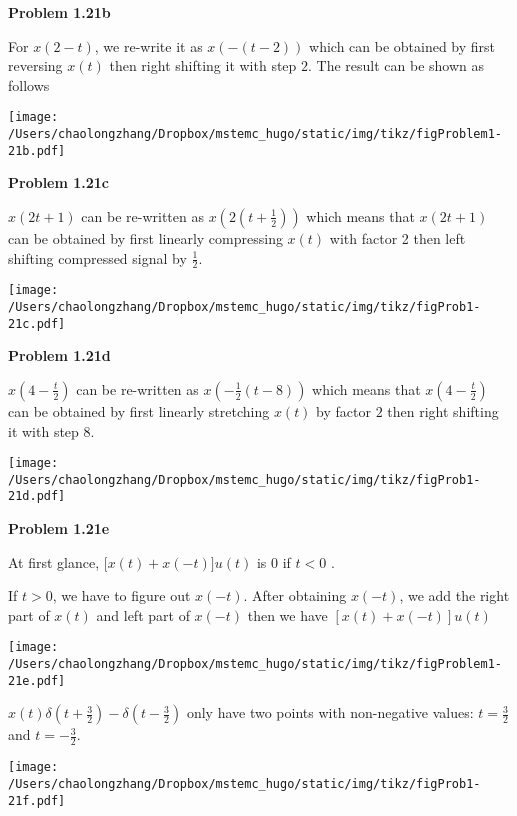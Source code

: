 \documentclass[koma,a4paper,utopia,12pt,listings-color,microtype,paralist,colorlinks,urlcolor=red]{org-article}
\begin{document}
\textbf{Problem 1.21b}

For \(x(2-t)\), we re-write it as \(x(-(t-2))\) which can be obtained by first
reversing \(x(t)\) then right shifting it with step \(2\). The result can be
shown as follows

\begin{center}
\texttt{[image: /Users/chaolongzhang/Dropbox/mstemc\_hugo/static/img/tikz/figProblem1-21b.pdf]}
\end{center}

\textbf{Problem 1.21c}

\(x(2t + 1)\) can be re-written as \(x(2(t+\frac{1}{2}))\) which means that
\(x(2t+1)\) can be obtained by first linearly compressing \(x(t)\) with factor 2
then left shifting compressed signal by \(\frac{1}{2}\).

\begin{center}
\texttt{[image: /Users/chaolongzhang/Dropbox/mstemc\_hugo/static/img/tikz/figProb1-21c.pdf]}
\end{center}

\textbf{Problem 1.21d}

\(x(4-\frac{t}{2})\) can be re-written as \(x( -\frac{1}{2}( t - 8 ) )\) which
means that \(x(4-\frac{t}{2})\)  can be obtained by first linearly stretching
\(x(t)\) by factor \(2\) then right shifting it with step \(8\).

\begin{center}
\texttt{[image: /Users/chaolongzhang/Dropbox/mstemc\_hugo/static/img/tikz/figProb1-21d.pdf]}
\end{center}

\textbf{Problem 1.21e}

At first glance, \(\big[x(t) + x(-t)\big] u(t)\) is \(0\) if \(t<0\) .

If \(t > 0\), we have to figure out \(x( -t )\). After obtaining \(x(-t)\), we
add the right part of \(x(t)\) and left part of \(x(-t)\) then we have \([x(t) +
x(-t)]u(t)\)

\begin{center}
\texttt{[image: /Users/chaolongzhang/Dropbox/mstemc\_hugo/static/img/tikz/figProblem1-21e.pdf]}
\end{center}

\(x(t)\delta(t +\frac{3}{2}) - \delta(t-\frac{3}{2})\) only have two points with
non-negative values: \(t=\frac{3}{2}\) and \(t=-\frac{3}{2}\).

\begin{center}
\texttt{[image: /Users/chaolongzhang/Dropbox/mstemc\_hugo/static/img/tikz/figProb1-21f.pdf]}
\end{center}
\end{document}

